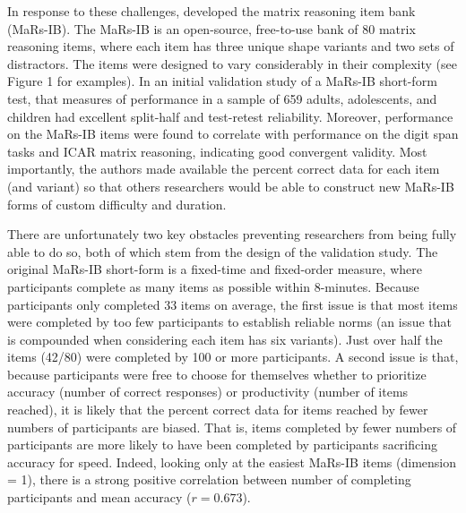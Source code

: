 \documentclass[a4paper,man,natbib]{apa6}
\begin{document}
In response to these challenges, \cite{chierchia2019matrix} developed the matrix reasoning item bank (MaRs-IB). The MaRs-IB is an open-source, free-to-use bank of 80 matrix reasoning items, where each item has three unique shape variants and two sets of distractors. The items were designed to vary considerably in their complexity (see Figure 1 for examples). In an initial validation study of a MaRs-IB short-form test, \cite{chierchia2019matrix} that measures of performance in a sample of 659 adults, adolescents, and children had excellent split-half and test-retest reliability. Moreover, performance on the MaRs-IB items were found to correlate with performance on the digit span tasks and ICAR matrix reasoning, indicating good convergent validity. Most importantly, the authors made available the percent correct data for each item (and variant) so that others researchers would be able to construct new MaRs-IB forms of custom difficulty and duration.

There are unfortunately two key obstacles preventing researchers from being fully able to do so, both of which stem from the design of the validation study. The original MaRs-IB short-form is a fixed-time and  fixed-order measure, where participants complete as many items as possible within 8-minutes. Because participants only completed 33 items on average, the first issue is that most items were completed by too few participants to establish reliable norms (an issue that is compounded when considering each item has six variants). Just over half the items (42/80) were completed by 100 or more participants. A second issue is that, because participants were free to choose for themselves whether to prioritize accuracy (number of correct responses) or productivity (number of items reached), it is likely that the percent correct data for items reached by fewer numbers of participants are biased. That is, items completed by fewer numbers of participants are more likely to have been completed by participants sacrificing accuracy for speed. Indeed, looking only at the easiest MaRs-IB items (dimension = 1), there is a strong positive correlation between number of completing participants and mean accuracy ($r = 0.673$). 
\end{document}
